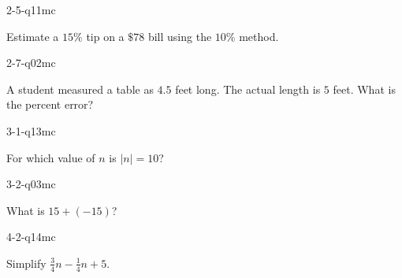 \begin{practiceQuestion}{2-5-q11}{mc}
\begin{questionText}
Estimate a $15\%$ tip on a $\$78$ bill using the $10\%$ method.
\end{questionText}
\end{practiceQuestion}

\begin{practiceQuestion}{2-7-q02}{mc}
\begin{questionText}
A student measured a table as $4.5$ feet long. The actual length is $5$ feet. What is the percent error?
\end{questionText}
\end{practiceQuestion}

\begin{practiceQuestion}{3-1-q13}{mc}
\begin{questionText}
For which value of $n$ is $|n| = 10$?
\end{questionText}
\end{practiceQuestion}

\begin{practiceQuestion}{3-2-q03}{mc}
\begin{questionText}
What is $15 + (-15)$?
\end{questionText}
\end{practiceQuestion}

\begin{practiceQuestion}{4-2-q14}{mc}
\begin{questionText}
Simplify $\frac{3}{4}n - \frac{1}{4}n + 5$.


\begin{center}
\hspace{1cm}
\end{center}
\end{questionText}
\end{practiceQuestion}

